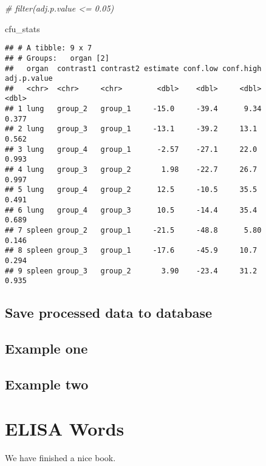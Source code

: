 \documentclass[
]{book}
\newenvironment{Shaded}{\begin{snugshade}}{\end{snugshade}}
\newcommand{\CommentTok}[1]{\textcolor[rgb]{0.56,0.35,0.01}{\textit{#1}}}
\newcommand{\NormalTok}[1]{#1}
\begin{document}
\begin{Shaded}
\begin{Highlighting}[]
  \CommentTok{\# filter(adj.p.value \textless{}= 0.05)}

\NormalTok{cfu\_stats}
\end{Highlighting}
\end{Shaded}

\begin{verbatim}
## # A tibble: 9 x 7
## # Groups:   organ [2]
##   organ  contrast1 contrast2 estimate conf.low conf.high adj.p.value
##   <chr>  <chr>     <chr>        <dbl>    <dbl>     <dbl>       <dbl>
## 1 lung   group_2   group_1     -15.0     -39.4      9.34       0.377
## 2 lung   group_3   group_1     -13.1     -39.2     13.1        0.562
## 3 lung   group_4   group_1      -2.57    -27.1     22.0        0.993
## 4 lung   group_3   group_2       1.98    -22.7     26.7        0.997
## 5 lung   group_4   group_2      12.5     -10.5     35.5        0.491
## 6 lung   group_4   group_3      10.5     -14.4     35.4        0.689
## 7 spleen group_2   group_1     -21.5     -48.8      5.80       0.146
## 8 spleen group_3   group_1     -17.6     -45.9     10.7        0.294
## 9 spleen group_3   group_2       3.90    -23.4     31.2        0.935
\end{verbatim}

\hypertarget{save-processed-data-to-database}{%
\section{Save processed data to database}\label{save-processed-data-to-database}}

\hypertarget{example-one}{%
\section{Example one}\label{example-one}}

\hypertarget{example-two}{%
\section{Example two}\label{example-two}}

\hypertarget{elisa-words}{%
\chapter{ELISA Words}\label{elisa-words}}

We have finished a nice book.

  
\end{document}
